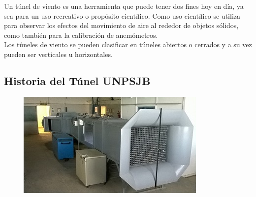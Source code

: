 

\begin{minipage}[t]{.3\textwidth}
	\centering{}
	\label{fig:tunelRec}
\end{minipage}	
\begin{minipage}[t]{.7\textwidth}

Un túnel de viento es una herramienta que puede tener dos fines hoy en día, ya sea para un uso recreativo o propósito científico.
Como uso científico se utiliza para observar los efectos del movimiento de aire al rededor de objetos sólidos, como también para la calibración de anemómetros.\\
Los túneles de viento se pueden clasificar en túneles abiertos o cerrados y a su vez pueden ser verticales u horizontales. 
\end{minipage}


\subsection{Historia del Túnel UNPSJB}

\begin{figure} 
	\begin{center}
		\includegraphics[scale=0.45]{tunel_unpsjb.JPG}
		\label{fig:tunelUni}
	\end{center}
	\vspace{-20pt}
	\end{figure}


